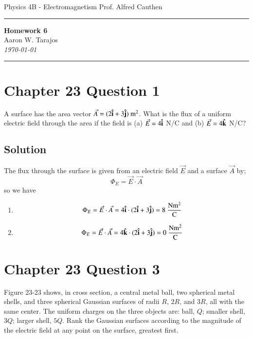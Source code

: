 \documentclass{article}
\newcommand{\m}{\text{m}}
\newcommand{\N}{\text{N}}
\newcommand{\C}{\text{C}}
\begin{document}
\noindent
Physics 4B - Electromagnetism \hfill Prof. Alfred Cauthen

\noindent\rule{\textwidth}{0.4pt}

\begin{center}
    \textbf{\LARGE Homework 6} \\
    \vspace{12pt}
    \large Aaron W. Tarajos \\
    \textit{\today}
\end{center}

\noindent\rule{\textwidth}{0.4pt}

\section*{Chapter 23 Question 1}
A surface has the area vector $\vec A = (2\vu i + 3\vu j)\ \m^2$. What is the flux of a uniform electric field through the area if the field is (a) $\vec E = 4\vu i$ N/C and (b) $\vec E = 4\vu k$ N/C?

\subsection*{Solution}
The flux through the surface is given from an electric field $\vec{E}$ and a surface $\vec{A}$ by;
\begin{equation*}
    \Phi_E = \vec{E} \cdot \vec{A}
\end{equation*}
so we have
\begin{enumerate}[label=(\alph*)]
    \item 
        \begin{equation*}
            \Phi_E = \vec{E} \cdot \vec{A} = 4\vu i \cdot (2\vu i + 3\vu j) = 8\ \frac{\N\m^2}{\C}
        \end{equation*}
    \item 
        \begin{equation*}
            \Phi_E = \vec{E} \cdot \vec{A} = 4\vu k \cdot (2\vu i + 3\vu j) = 0\ \frac{\N\m^2}{\C}
        \end{equation*}
\end{enumerate}

\section*{Chapter 23 Question 3}
Figure 23-23 shows, in cross section, a central metal ball, two spherical metal shells, and three spherical Gaussian surfaces of radii $R$, $2R$, and $3R$, all with the same center. The uniform charges on the three objects are: ball, $Q$; smaller shell, $3Q$; larger shell, $5Q$. Rank the Gaussian surfaces according to the magnitude of the electric field at any point on the surface, greatest first.
\end{document}
